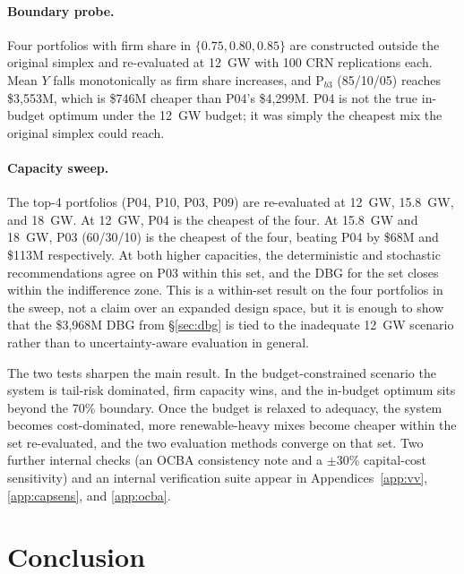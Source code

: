 \documentclass[11pt]{article}
\begin{document}
\paragraph{Boundary probe.} Four portfolios with firm share in $\{0.75, 0.80, 0.85\}$ are constructed outside the original simplex and re-evaluated at 12~GW with 100 CRN replications each. Mean $Y$ falls monotonically as firm share increases, and P$_{b3}$ (85/10/05) reaches \$3{,}553M, which is \$746M cheaper than P04's \$4{,}299M. P04 is not the true in-budget optimum under the 12~GW budget; it was simply the cheapest mix the original simplex could reach.

\paragraph{Capacity sweep.} The top-4 portfolios (P04, P10, P03, P09) are re-evaluated at 12~GW, 15.8~GW, and 18~GW. At 12~GW, P04 is the cheapest of the four. At 15.8~GW and 18~GW, P03 (60/30/10) is the cheapest of the four, beating P04 by \$68M and \$113M respectively. At both higher capacities, the deterministic and stochastic recommendations agree on P03 within this set, and the DBG for the set closes within the indifference zone. This is a within-set result on the four portfolios in the sweep, not a claim over an expanded design space, but it is enough to show that the \$3{,}968M DBG from \S\ref{sec:dbg} is tied to the inadequate 12~GW scenario rather than to uncertainty-aware evaluation in general.

The two tests sharpen the main result. In the budget-constrained scenario the system is tail-risk dominated, firm capacity wins, and the in-budget optimum sits beyond the 70\% boundary. Once the budget is relaxed to adequacy, the system becomes cost-dominated, more renewable-heavy mixes become cheaper within the set re-evaluated, and the two evaluation methods converge on that set. Two further internal checks (an OCBA consistency note and a $\pm 30\%$ capital-cost sensitivity) and an internal verification suite appear in Appendices~\ref{app:vv}, \ref{app:capsens}, and \ref{app:ocba}.

\section{Conclusion}\label{sec:conclusion}
\end{document}
